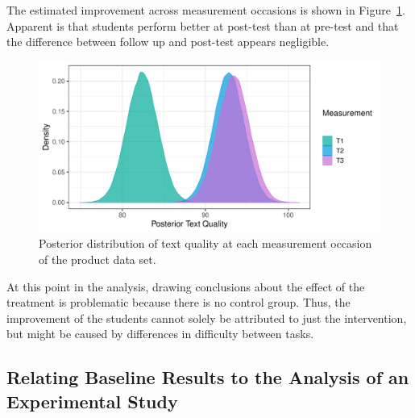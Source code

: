 \documentclass[a4paper]{article}
\begin{document}
The estimated improvement across measurement occasions is shown in Figure~\ref{fig:productPosteriorTextQual}. Apparent is that students perform better at post-test than at pre-test and that the difference between follow up and post-test appears negligible.
\begin{figure}[!ht]
	\centering
	\includegraphics[width=\textwidth]{figures/productPosteriorTextQuality.pdf}
	\caption{Posterior distribution of text quality at each measurement occasion of the product data set.}
	\label{fig:productPosteriorTextQual}	
\end{figure}
At this point in the analysis, drawing conclusions about the effect of the treatment is problematic because there is no control group. Thus, the improvement of the students cannot solely be attributed to just the intervention, but might be caused by differences in difficulty between tasks.


\subsection*{Relating Baseline Results to the Analysis of an Experimental Study}
\tbPostMeansProdCC
\end{document}
